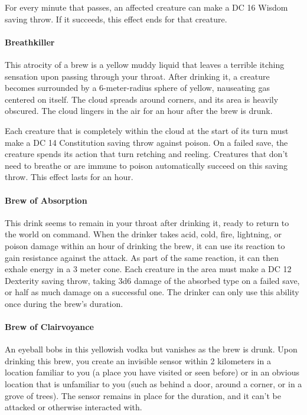         For every minute that passes, an affected creature can make a DC 16 Wisdom saving throw.
        If it succeeds, this effect ends for that creature.
    \paragraph{Breathkiller} %
        This atrocity of a brew is a yellow muddy liquid that leaves a terrible itching sensation upon passing through your throat.
        After drinking it, a creature becomes surrounded by a 6-meter-radius sphere of yellow, nauseating gas centered on itself.
        The cloud spreads around corners, and its area is heavily obscured.
        The cloud lingers in the air for an hour after the brew is drunk.

        Each creature that is completely within the cloud at the start of its turn must make a DC 14 Constitution saving throw against poison.
        On a failed save, the creature spends its action that turn retching and reeling.
        Creatures that don't need to breathe or are immune to poison automatically succeed on this saving throw.
        This effect lasts for an hour.
    \paragraph{Brew of Absorption} %
        This drink seems to remain in your throat after drinking it, ready to return to the world on command.
        When the drinker takes acid, cold, fire, lightning, or poison damage within an hour of drinking the brew, it can use its reaction to gain resistance against the attack.
        As part of the same reaction, it can then exhale energy in a 3 meter cone.
        Each creature in the area must make a DC 12 Dexterity saving throw, taking 3d6 damage of the absorbed type on a failed save, or half as much damage on a successful one.
        The drinker can only use this ability once during the brew's duration.
    \paragraph{Brew of Clairvoyance} %
        An eyeball bobs in this yellowish vodka but vanishes as the brew is drunk.
        Upon drinking this brew, you create an invisible sensor within 2 kilometers in a location familiar to you (a place you have visited or seen before) or in an obvious location that is unfamiliar to you (such as behind a door, around a corner, or in a grove of trees).
        The sensor remains in place for the duration, and it can't be attacked or otherwise interacted with.

